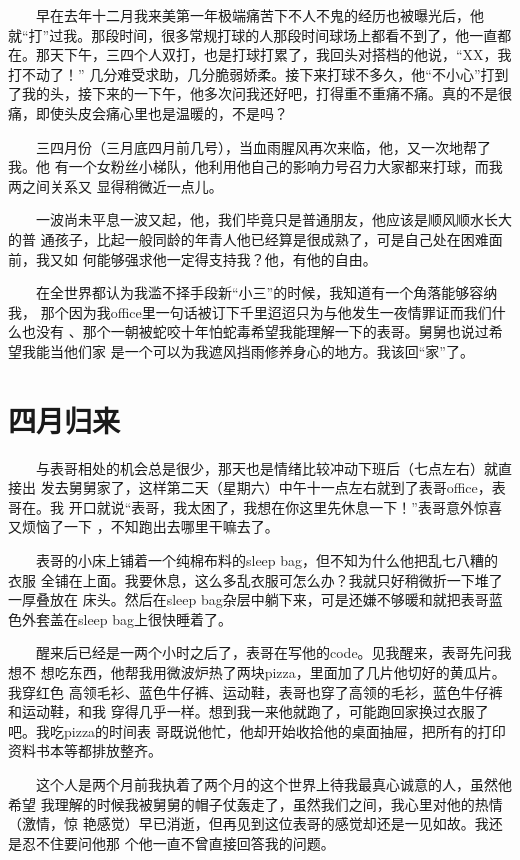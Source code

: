 \documentclass[12pt]{book}
\begin{document}
　　早在去年十二月我来美第一年极端痛苦下不人不鬼的经历也被曝光后，他就“打”过我。那段时间，很多常规打球的人那段时间球场上都看不到了，他一直都在。那天下午，三四个人双打，也是打球打累了，我回头对搭档的他说，“XX，我打不动了！” 几分难受求助，几分脆弱娇柔。接下来打球不多久，他“不小心”打到了我的头，接下来的一下午，他多次问我还好吧，打得重不重痛不痛。真的不是很痛，即使头皮会痛心里也是温暖的，不是吗？

　　三四月份（三月底四月前几号），当血雨腥风再次来临，他，又一次地帮了我。他
有一个女粉丝小梯队，他利用他自己的影响力号召力大家都来打球，而我两之间关系又
显得稍微近一点儿。

　　一波尚未平息一波又起，他，我们毕竟只是普通朋友，他应该是顺风顺水长大的普
通孩子，比起一般同龄的年青人他已经算是很成熟了，可是自己处在困难面前，我又如
何能够强求他一定得支持我？他，有他的自由。

　　在全世界都认为我滥不择手段新“小三”的时候，我知道有一个角落能够容纳我，
那个因为我office里一句话被订下千里迢迢只为与他发生一夜情罪证而我们什么也没有
、那个一朝被蛇咬十年怕蛇毒希望我能理解一下的表哥。舅舅也说过希望我能当他们家
是一个可以为我遮风挡雨修养身心的地方。我该回“家”了。
\section{四月归来}
\label{sec-8-9}

　　与表哥相处的机会总是很少，那天也是情绪比较冲动下班后（七点左右）就直接出
发去舅舅家了，这样第二天（星期六）中午十一点左右就到了表哥office，表哥在。我
开口就说“表哥，我太困了，我想在你这里先休息一下！”表哥意外惊喜又烦恼了一下
，不知跑出去哪里干嘛去了。

　　表哥的小床上铺着一个纯棉布料的sleep bag，但不知为什么他把乱七八糟的衣服
全铺在上面。我要休息，这么多乱衣服可怎么办？我就只好稍微折一下堆了一厚叠放在
床头。然后在sleep bag杂层中躺下来，可是还嫌不够暖和就把表哥蓝色外套盖在sleep
bag上很快睡着了。

　　醒来后已经是一两个小时之后了，表哥在写他的code。见我醒来，表哥先问我想不
想吃东西，他帮我用微波炉热了两块pizza，里面加了几片他切好的黄瓜片。我穿红色
高领毛衫、蓝色牛仔裤、运动鞋，表哥也穿了高领的毛衫，蓝色牛仔裤和运动鞋，和我
穿得几乎一样。想到我一来他就跑了，可能跑回家换过衣服了吧。我吃pizza的时间表
哥既说他忙，他却开始收拾他的桌面抽屉，把所有的打印资料书本等都排放整齐。

　　这个人是两个月前我执着了两个月的这个世界上待我最真心诚意的人，虽然他希望
我理解的时候我被舅舅的帽子仗轰走了，虽然我们之间，我心里对他的热情（激情，惊
艳感觉）早已消逝，但再见到这位表哥的感觉却还是一见如故。我还是忍不住要问他那
个他一直不曾直接回答我的问题。
\end{document}
